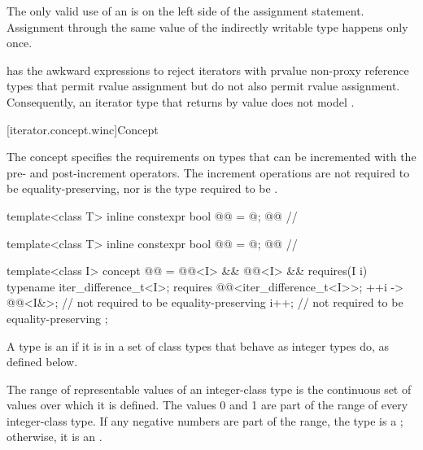 \pnum
\begin{note}
The only valid use of an  is on the left side of the assignment statement.
Assignment through the same value of the indirectly writable type happens only once.
\end{note}

\pnum
\begin{note}
 has the awkward  expressions to reject
iterators with prvalue non-proxy reference types that permit rvalue
assignment but do not also permit  rvalue assignment.
Consequently, an iterator type  that returns 
by value does not model .
\end{note}

[iterator.concept.winc]{Concept }

\pnum
The  concept specifies the requirements on
types that can be incremented with the pre- and post-increment operators.
The increment operations are not required to be equality-preserving,
nor is the type required to be .

\begin{codeblock}
template<class T>
  inline constexpr bool @@ = @\seebelow@; @\itcorr[-2]@           // \expos

template<class T>
  inline constexpr bool @@ = @\seebelow@; @\itcorr[-2]@    // \expos

template<class I>
  concept @@ =
    @@<I> && @@<I> &&
    requires(I i) {
      typename iter_difference_t<I>;
      requires @@<iter_difference_t<I>>;
      { ++i } -> @@<I&>;   // not required to be equality-preserving
      i++;                      // not required to be equality-preserving
    };
\end{codeblock}

\pnum
A type  is an 
if it is in a set of  class types
that behave as integer types do, as defined below.

\pnum
The range of representable values of an integer-class type
is the continuous set of values over which it is defined.
The values 0 and 1 are part of the range of every integer-class type.
If any negative numbers are part of the range,
the type is a ;
otherwise, it is an .

